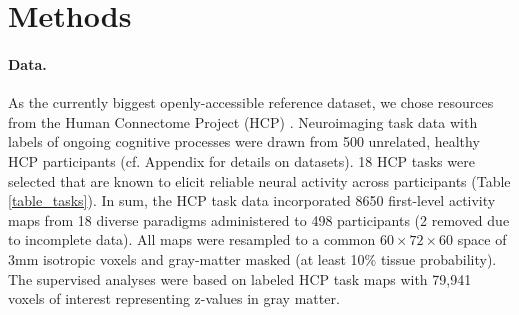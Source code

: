 \documentclass{article} %
\begin{document}
\section{Methods}
%
\paragraph{Data.}
As the currently biggest openly-accessible reference dataset,
we chose resources from the Human Connectome Project (HCP)
\cite{barch2013}.
Neuroimaging task data with labels of ongoing cognitive processes
were drawn from 500 unrelated,
healthy HCP participants (cf. Appendix for details on datasets).
18 HCP tasks 
were selected that are known to elicit reliable neural activity
across participants (Table \ref{table_tasks}).
In sum, the HCP task data incorporated 8650 first-level activity maps
from 18 diverse paradigms administered to 498 participants (2 removed
due to incomplete data).
All maps were resampled to a common $60\times72\times60$ space of
3mm isotropic voxels and gray-matter masked (at least 10\% tissue
probability).
The supervised analyses were based on labeled HCP task maps with
79,941 voxels of interest representing z-values in gray matter.
\end{document}
